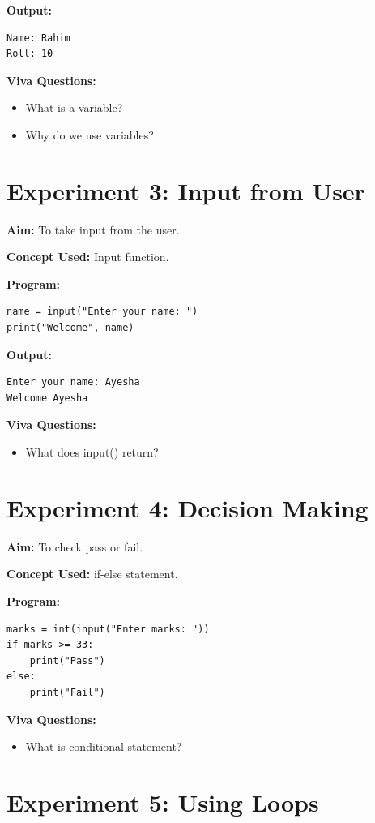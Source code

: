 \textbf{Output:}
\begin{verbatim}
Name: Rahim
Roll: 10
\end{verbatim}

\textbf{Viva Questions:}
\begin{itemize}
    \item What is a variable?
    \item Why do we use variables?
\end{itemize}

\newpage
\section*{Experiment 3: Input from User}

\textbf{Aim:}  
To take input from the user.

\textbf{Concept Used:}  
Input function.

\textbf{Program:}
\begin{verbatim}
name = input("Enter your name: ")
print("Welcome", name)
\end{verbatim}

\textbf{Output:}
\begin{verbatim}
Enter your name: Ayesha
Welcome Ayesha
\end{verbatim}

\textbf{Viva Questions:}
\begin{itemize}
    \item What does input() return?
\end{itemize}

\newpage
\section*{Experiment 4: Decision Making}

\textbf{Aim:}  
To check pass or fail.

\textbf{Concept Used:}  
if-else statement.

\textbf{Program:}
\begin{verbatim}
marks = int(input("Enter marks: "))
if marks >= 33:
    print("Pass")
else:
    print("Fail")
\end{verbatim}

\textbf{Viva Questions:}
\begin{itemize}
    \item What is conditional statement?
\end{itemize}

\newpage
\section*{Experiment 5: Using Loops}


